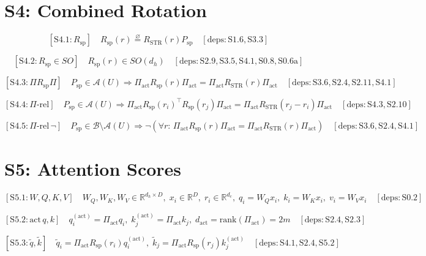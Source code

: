 \documentclass[11pt]{article}
\newcommand{\Real}{\mathbb{R}}
\newcommand{\eqdef}{\overset{\varnothing}{=}}
\newcommand{\deps}[1]{\quad[\mathrm{deps}:#1]}
\begin{document}
\section*{S4: Combined Rotation}

\[
\boxed{[\mathrm{S4}.1:R_{\mathrm{sp}}]}\quad
R_{\mathrm{sp}}(r) \eqdef R_{\mathrm{STR}}(r)P_{\mathrm{sp}}
\deps{\mathrm{S1}.6,\mathrm{S3}.3}
\]

\[
\boxed{[\mathrm{S4}.2:R_{\mathrm{sp}}\in SO]}\quad
R_{\mathrm{sp}}(r)\in SO(d_h)
\deps{\mathrm{S2}.9,\mathrm{S3}.5,\mathrm{S4}.1,\mathrm{S0}.8,\mathrm{S0}.6\mathrm{a}}
\]

\[
\boxed{[\mathrm{S4}.3:\Pi R_{\mathrm{sp}}\Pi]}\quad
P_{\mathrm{sp}}\in\mathcal{A}(U) \Rightarrow \Pi_{\mathrm{act}}R_{\mathrm{sp}}(r)\Pi_{\mathrm{act}}=\Pi_{\mathrm{act}}R_{\mathrm{STR}}(r)\Pi_{\mathrm{act}}
\deps{\mathrm{S3}.6,\mathrm{S2}.4,\mathrm{S2}.11,\mathrm{S4}.1}
\]

\[
\boxed{[\mathrm{S4}.4:\Pi\text{-rel}]}\quad
P_{\mathrm{sp}}\in\mathcal{A}(U) \Rightarrow
\Pi_{\mathrm{act}}R_{\mathrm{sp}}(r_i)^\top R_{\mathrm{sp}}(r_j)\Pi_{\mathrm{act}}
=\Pi_{\mathrm{act}}R_{\mathrm{STR}}(r_j-r_i)\Pi_{\mathrm{act}}
\deps{\mathrm{S4}.3,\mathrm{S2}.10}
\]

\[
\boxed{[\mathrm{S4}.5:\Pi\text{-rel}\,\neg]}\quad
P_{\mathrm{sp}}\in\mathcal{B}\setminus\mathcal{A}(U) \Rightarrow
\neg(\forall r:\, \Pi_{\mathrm{act}}R_{\mathrm{sp}}(r)\Pi_{\mathrm{act}}=\Pi_{\mathrm{act}}R_{\mathrm{STR}}(r)\Pi_{\mathrm{act}})
\deps{\mathrm{S3}.6,\mathrm{S2}.4,\mathrm{S4}.1}
\]

\section*{S5: Attention Scores}

\[
\boxed{[\mathrm{S5}.1:W,Q,K,V]}\quad
W_Q,W_K,W_V\in\Real^{d_h\times D},\; x_i\in\Real^D,\; r_i\in\Real^{d_c},\;
q_i=W_Qx_i,\; k_i=W_Kx_i,\; v_i=W_Vx_i
\deps{\mathrm{S0}.2}
\]

\[
\boxed{[\mathrm{S5}.2:\mathrm{act}\,q,k]}\quad
q_i^{(\mathrm{act})}=\Pi_{\mathrm{act}}q_i,\; k_j^{(\mathrm{act})}=\Pi_{\mathrm{act}}k_j,\; d_{\mathrm{act}}=\mathrm{rank}(\Pi_{\mathrm{act}})=2m
\deps{\mathrm{S2}.4,\mathrm{S2}.3}
\]

\[
\boxed{[\mathrm{S5}.3:\tilde q,\tilde k]}\quad
\tilde q_i=\Pi_{\mathrm{act}}R_{\mathrm{sp}}(r_i)q_i^{(\mathrm{act})},\;
\tilde k_j=\Pi_{\mathrm{act}}R_{\mathrm{sp}}(r_j)k_j^{(\mathrm{act})}
\deps{\mathrm{S4}.1,\mathrm{S2}.4,\mathrm{S5}.2}
\]
\end{document}
